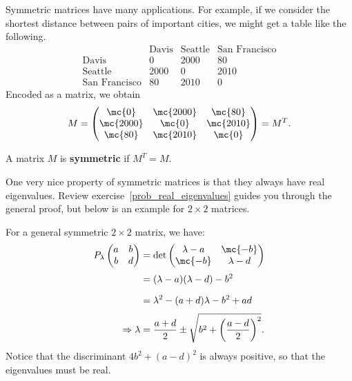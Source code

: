 
\chapter{\diagSymMatTitle}\label{symmetricmatrices}

Symmetric matrices have many applications.  For example, if we consider the shortest distance between pairs of important cities, we might get a table like the following.
\[
\begin{array}{c|ccc}
 & \text{Davis} & \text{Seattle} 
& \text{San Francisco} \\ \hline
\text{Davis} & 0 & 2000 & 80 \\
\text{Seattle} & 2000 & 0 & 2010 \\
\text{San Francisco} & 80 & 2010 & 0
\end{array}
\]
Encoded as a matrix, we obtain
\[
M=\begin{pmatrix}
\mc{0} & \mc{2000} & \mc{80} \\
\mc{2000} & \mc{0} & \mc{2010} \\
\mc{80} & \mc{2010} & \mc{0}
\end{pmatrix}=M^T.
\]

\begin{definition}
A matrix $M$ is {\bfseries symmetric} if  $M^T=M.$
\end{definition}

One very nice property of symmetric matrices is that they always have real eigenvalues.  Review exercise~\ref{prob_real_eigenvalues} guides you through the general proof, but below is an example for $2\times 2$ matrices.

\begin{example}
For a general symmetric $2\times 2$ matrix, we have:
\begin{align*}
P_\lambda \begin{pmatrix} a & b \\ b& d \end{pmatrix}
 &=
\det\begin{pmatrix}\lambda-a&\mc{-b}\\\mc{-b}&\lambda-d \end{pmatrix}\\[1mm]
&= (\lambda-a)(\lambda-d)-b^2 \\[2mm]
&= \lambda^2-(a+d)\lambda-b^2+ad\\[1mm]
\Rightarrow \lambda &= \frac{a+d}{2}\pm \sqrt{b^2+\left(\frac{a-d}{2}\right)^2}.
\end{align*}
Notice that the discriminant $4b^2+(a-d)^2$ is always positive, so that the eigenvalues must be real.
\end{example}

